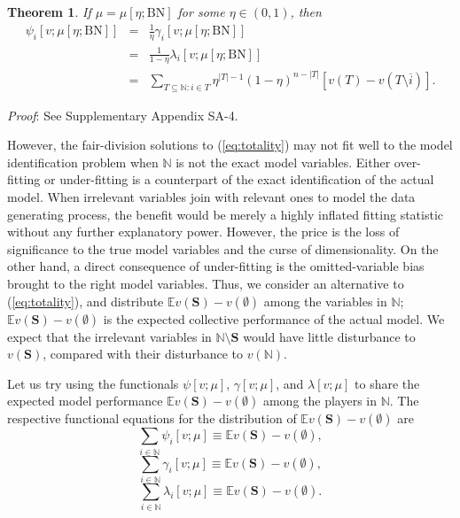 \documentclass[a4paper,12pt]{article}
\newtheorem{theorem}{Theorem}
\begin{document}
\begin{theorem}\label{thm:binomial} 
If $\mu=\mu[\eta; \mathrm{BN}]$ for some $\eta\in (0,1)$, then
\begin{equation} \label{eq:binomialPsi}
\begin{array}{rcl}
\psi_i [v; \mu[\eta; \mathrm{BN}]] 
&=& \frac{1}{\eta} \gamma_i [v; \mu[\eta; \mathrm{BN}]] \\
&=& \frac{1}{1-\eta} \lambda_i [v;\mu[\eta; \mathrm{BN}]] \\
&=& \sum\limits_{T\subseteq \mathbb{N}: i \in T} \eta^{|T|-1} (1-\eta)^{n-|T|} \left [ v(T) - v(T\setminus \overline{i}) \right ]. 
\end{array}
\end{equation}
\end{theorem}

\noindent \textit{Proof}: See Supplementary Appendix SA-4.

However, the fair-division solutions to (\ref{eq:totality}) may not fit well to the model identification problem when $\mathbb{N}$ is not the exact model variables.
Either over-fitting or under-fitting is a counterpart of the exact identification of the actual model.
When irrelevant variables join with relevant ones to model the data generating process, the benefit would be merely a highly inflated fitting statistic without any further explanatory power.
However, the price is the loss of significance to the true model variables and the curse of dimensionality.
On the other hand, a direct consequence of under-fitting is the omitted-variable bias brought to the right model variables.
Thus, we consider an alternative to (\ref{eq:totality}), and distribute $\mathbb{E} v(\mathbf{S}) - v(\emptyset)$ 
among the variables in $\mathbb{N}$; $\mathbb{E} v(\mathbf{S}) - v(\emptyset)$ is the expected collective performance of the actual model.
We expect that the irrelevant variables in $\mathbb{N}\setminus \mathbf{S}$ would have little disturbance to $v(\mathbf{S})$,
compared with their disturbance to $v(\mathbb{N})$. 

Let us try using the functionals $\psi[v;\mu]$, $\gamma[v;\mu]$, and $\lambda[v;\mu]$ to share the expected model performance $\mathbb{E} v(\mathbf{S}) - v(\emptyset)$
among the players in $\mathbb{N}$. The respective functional equations for the distribution of $\mathbb{E} v(\mathbf{S}) - v(\emptyset)$ are
\begin{equation}\label{eq:divide_expectation_psi}
\sum\limits_{i\in \mathbb{N}} \psi_i[v;\mu] \equiv  \mathbb{E} v(\mathbf{S}) - v(\emptyset),
\end{equation}
\begin{equation}\label{eq:divide_expectation_gamma}
\sum\limits_{i\in \mathbb{N}}  \gamma_i[v;\mu] \equiv  \mathbb{E} v(\mathbf{S}) - v(\emptyset),
\end{equation}
\begin{equation}\label{eq:divide_expectation_lambda}
\sum\limits_{i\in \mathbb{N}} \lambda_i[v;\mu] \equiv  \mathbb{E} v(\mathbf{S}) - v(\emptyset).
\end{equation}
\end{document}
